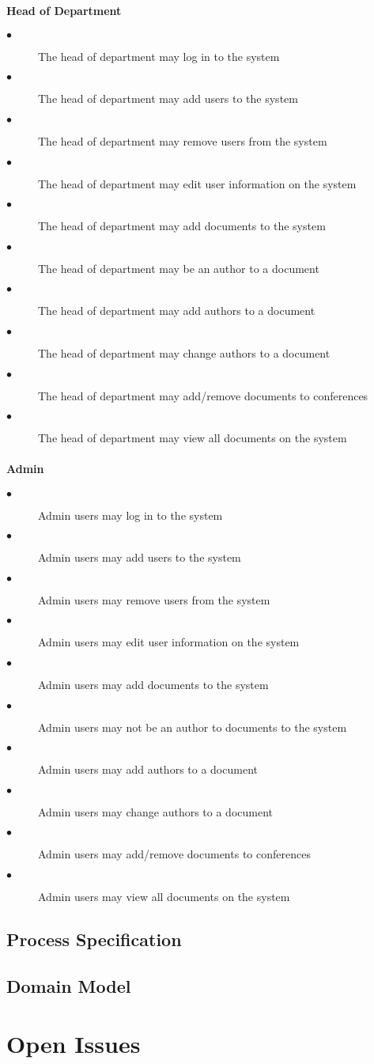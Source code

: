 \documentclass[a4paper]{article}
\begin{document}
\paragraph{\textbf{Head of Department}}
\begin{description}
  \item[$\bullet$] The head of department may log in to the system
    \item[$\bullet$] The head of department may add users to the system
    \item[$\bullet$] The head of department may remove users from the system
    \item[$\bullet$] The head of department may edit user information on the system
    \item[$\bullet$] The head of department may add documents to the system
    \item[$\bullet$] The head of department may be an author to a document
    \item[$\bullet$] The head of department may add authors to a document
    \item[$\bullet$] The head of department may change authors to a document
    \item[$\bullet$] The head of department may add/remove documents to conferences
    \item[$\bullet$] The head of department may view all documents on the system
\end{description}
\paragraph{\textbf{Admin}}
\begin{description}
  \item[$\bullet$] Admin users may log in to the system
    \item[$\bullet$] Admin users may add users to the system
    \item[$\bullet$] Admin users may remove users from the system
    \item[$\bullet$] Admin users may edit user information on the system
    \item[$\bullet$] Admin users may add documents to the system
    \item[$\bullet$] Admin users may not be an author to documents to the system
    \item[$\bullet$] Admin users may add authors to a document
    \item[$\bullet$] Admin users may change authors to a document
    \item[$\bullet$] Admin users may add/remove documents to conferences
    \item[$\bullet$] Admin users may view all documents on the system
\end{description}

\subsection{Process Specification}
\subsection{Domain Model}


\section{Open Issues}
\end{document}
